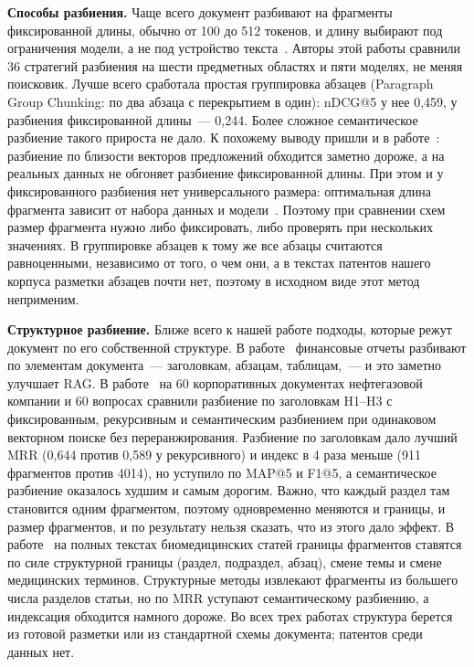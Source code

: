 \documentclass{article}
\begin{document}
\textbf{Способы разбиения.}
Чаще всего документ разбивают на фрагменты фиксированной длины, обычно от 100 до 512 токенов, и длину выбирают под ограничения модели, а не под устройство текста~\citep{shaukat2026chunking}. Авторы этой работы сравнили 36 стратегий разбиения на шести предметных областях и пяти моделях, не меняя поисковик. Лучше всего сработала простая группировка абзацев (Paragraph Group Chunking: по два абзаца с перекрытием в один): nDCG@5 у нее 0,459, у разбиения фиксированной длины~--- 0,244. Более сложное семантическое разбиение такого прироста не дало. К похожему выводу пришли и в работе~\citep{qu2025semantic}: разбиение по близости векторов предложений обходится заметно дороже, а на реальных данных не обгоняет разбиение фиксированной длины. При этом и у фиксированного разбиения нет универсального размера: оптимальная длина фрагмента зависит от набора данных и модели~\citep{bhat2025chunksize}. Поэтому при сравнении схем размер фрагмента нужно либо фиксировать, либо проверять при нескольких значениях. В группировке абзацев к тому же все абзацы считаются равноценными, независимо от того, о чем они, а в текстах патентов нашего корпуса разметки абзацев почти нет, поэтому в исходном виде этот метод неприменим.

\textbf{Структурное разбиение.}
Ближе всего к нашей работе подходы, которые режут документ по его собственной структуре. В работе~\citep{jimenoyepes2024financial} финансовые отчеты разбивают по элементам документа~--- заголовкам, абзацам, таблицам,~--- и это заметно улучшает RAG. В работе~\citep{taiwo2026oilgas} на 60 корпоративных документах нефтегазовой компании и 60 вопросах сравнили разбиение по заголовкам H1--H3 с фиксированным, рекурсивным и семантическим разбиением при одинаковом векторном поиске без переранжирования. Разбиение по заголовкам дало лучший MRR (0,644 против 0,589 у рекурсивного) и индекс в 4 раза меньше (911 фрагментов против 4014), но уступило по MAP@5 и F1@5, а семантическое разбиение оказалось худшим и самым дорогим. Важно, что каждый раздел там становится одним фрагментом, поэтому одновременно меняются и границы, и размер фрагментов, и по результату нельзя сказать, что из этого дало эффект. В работе~\citep{mortezaagha2026gralc} на полных текстах биомедицинских статей границы фрагментов ставятся по силе структурной границы (раздел, подраздел, абзац), смене темы и смене медицинских терминов. Структурные методы извлекают фрагменты из большего числа разделов статьи, но по MRR уступают семантическому разбиению, а индексация обходится намного дороже. Во всех трех работах структура берется из готовой разметки или из стандартной схемы документа; патентов среди данных нет.
\end{document}
